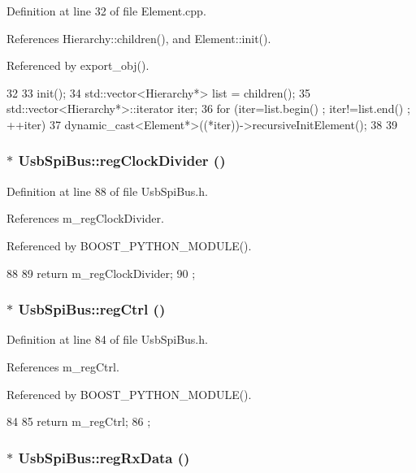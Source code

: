 Definition at line 32 of file Element.cpp.

References Hierarchy::children(), and Element::init().

Referenced by export\_\-obj().


\begin{DoxyCode}
32                                   {
33   init();
34   std::vector<Hierarchy*> list = children();
35   std::vector<Hierarchy*>::iterator iter;
36   for (iter=list.begin() ; iter!=list.end() ; ++iter){
37     dynamic_cast<Element*>((*iter))->recursiveInitElement();
38   }
39 }
\end{DoxyCode}
\hypertarget{classUsbSpiBus_a338edc7bdac1abd1998890bb1aa0509a}{
\subsubsection[{regClockDivider}]{$\ast$ UsbSpiBus::regClockDivider ()}}
\label{classUsbSpiBus_a338edc7bdac1abd1998890bb1aa0509a}


Definition at line 88 of file UsbSpiBus.h.

References m\_\-regClockDivider.

Referenced by BOOST\_\-PYTHON\_\-MODULE().


\begin{DoxyCode}
88                               {
89     return m_regClockDivider;
90   };
\end{DoxyCode}
\hypertarget{classUsbSpiBus_a22900de7a32af6916f74584f2172424a}{
\subsubsection[{regCtrl}]{$\ast$ UsbSpiBus::regCtrl ()}}
\label{classUsbSpiBus_a22900de7a32af6916f74584f2172424a}


Definition at line 84 of file UsbSpiBus.h.

References m\_\-regCtrl.

Referenced by BOOST\_\-PYTHON\_\-MODULE().


\begin{DoxyCode}
84                       {
85     return m_regCtrl;
86   };
\end{DoxyCode}
\hypertarget{classUsbSpiBus_adb0c94f37c7e6008ed4540efa94559b3}{
\subsubsection[{regRxData}]{$\ast$ UsbSpiBus::regRxData ()}}
\label{classUsbSpiBus_adb0c94f37c7e6008ed4540efa94559b3}


